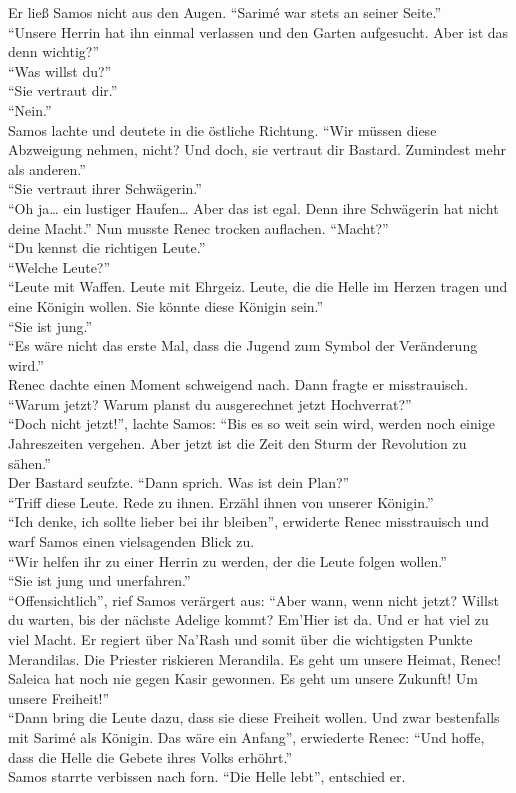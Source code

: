 Er ließ Samos nicht aus den Augen. ``Sarimé war stets an seiner Seite.''\\
``Unsere Herrin hat ihn einmal verlassen und den Garten aufgesucht. Aber ist das denn wichtig?''\\
``Was willst du?''\\
``Sie vertraut dir.''\\
``Nein.''\\
Samos lachte und deutete in die östliche Richtung. ``Wir müssen diese Abzweigung nehmen, nicht? Und 
doch, sie vertraut dir Bastard. Zumindest mehr als anderen.''\\
``Sie vertraut ihrer Schwägerin.''\\
``Oh ja… ein lustiger Haufen… Aber das ist egal. Denn ihre Schwägerin hat nicht deine Macht.''
Nun musste Renec trocken auflachen. ``Macht?''\\
``Du kennst die richtigen Leute.''\\
``Welche Leute?''\\
``Leute mit Waffen. Leute mit Ehrgeiz. Leute, die die Helle im Herzen tragen und eine Königin 
wollen. Sie könnte diese Königin sein.''\\
``Sie ist jung.''\\
``Es wäre nicht das erste Mal, dass die Jugend zum Symbol der Veränderung wird.''\\
Renec dachte einen Moment schweigend nach. Dann fragte er misstrauisch. ``Warum jetzt? Warum planst 
du ausgerechnet jetzt Hochverrat?''\\
``Doch nicht jetzt!'', lachte Samos: ``Bis es so weit sein wird, werden noch einige Jahreszeiten 
vergehen. Aber jetzt ist die Zeit den Sturm der Revolution zu sähen.''\\
Der Bastard seufzte. ``Dann sprich. Was ist dein Plan?''\\
``Triff diese Leute. Rede zu ihnen. Erzähl ihnen von unserer Königin.''\\
``Ich denke, ich sollte lieber bei ihr bleiben'', erwiderte Renec misstrauisch und warf Samos einen 
vielsagenden Blick zu.\\
``Wir helfen ihr zu einer Herrin zu werden, der die Leute folgen wollen.''\\
``Sie ist jung und unerfahren.''\\
``Offensichtlich'', rief Samos verärgert aus: ``Aber wann, wenn nicht jetzt? Willst du warten, bis 
der nächste Adelige kommt? Em'Hier ist da. Und er hat viel zu viel Macht. Er regiert über Na'Rash 
und somit über die wichtigsten Punkte Merandilas. Die Priester riskieren Merandila. Es geht um 
unsere Heimat, Renec! Saleica hat noch nie gegen Kasir gewonnen. Es geht um unsere Zukunft! Um 
unsere Freiheit!''\\
``Dann bring die Leute dazu, dass sie diese Freiheit wollen. Und zwar bestenfalls mit Sarimé als 
Königin. Das wäre ein Anfang'', erwiederte Renec: ``Und hoffe, dass die Helle die Gebete ihres 
Volks erhöhrt.''\\
Samos starrte verbissen nach forn. ``Die Helle lebt'', entschied er.\\


